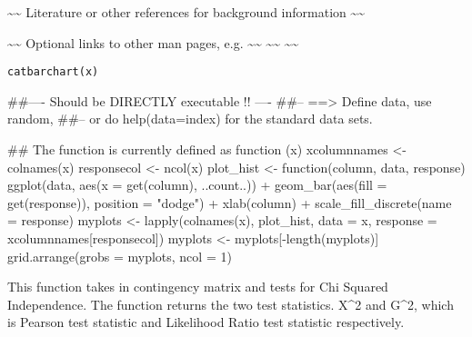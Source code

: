 \documentclass[letterpaper]{book}
\begin{document}
%
\begin{References}\relax
\textasciitilde{}\textasciitilde{} Literature or other references for background information \textasciitilde{}\textasciitilde{}
\end{References}
%
\begin{SeeAlso}\relax
\textasciitilde{}\textasciitilde{} Optional links to other man pages, e.g. \textasciitilde{}\textasciitilde{}
\textasciitilde{}\textasciitilde{}  \textasciitilde{}\textasciitilde{}
\end{SeeAlso}
%
\begin{Usage}
\begin{verbatim}
catbarchart(x)
\end{verbatim}
\end{Usage}
%
\begin{Arguments}
\begin{ldescription}
\item[\code{x}] 


\end{ldescription}
\end{Arguments}
%
\begin{Examples}
\begin{ExampleCode}
##---- Should be DIRECTLY executable !! ----
##-- ==>  Define data, use random,
##--	or do  help(data=index)  for the standard data sets.

## The function is currently defined as
function (x) 
{
    xcolumnnames <- colnames(x)
    responsecol <- ncol(x)
    plot_hist <- function(column, data, response) ggplot(data, 
        aes(x = get(column), ..count..)) + geom_bar(aes(fill = get(response)), 
        position = "dodge") + xlab(column) + scale_fill_discrete(name = response)
    myplots <- lapply(colnames(x), plot_hist, data = x, response = xcolumnnames[responsecol])
    myplots <- myplots[-length(myplots)]
    grid.arrange(grobs = myplots, ncol = 1)
  }
\end{ExampleCode}
\end{Examples}
%
\begin{Description}\relax
This function takes in contingency matrix and tests for Chi Squared Independence. The function returns the two test statistics. 
X\textasciicircum{}2 and G\textasciicircum{}2, which is Pearson test statistic and Likelihood Ratio test statistic respectively.    
\end{Description}
\end{document}
